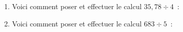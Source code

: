 \documentclass[activite]{thedocument}
\begin{document}
    \begin{enumerate}
        \item Voici comment poser et effectuer le calcul $35,78\div4$~:\vskip220pt
        \item Voici comment poser et effectuer le calcul $683\div5$~:
    \end{enumerate}
\end{document}
